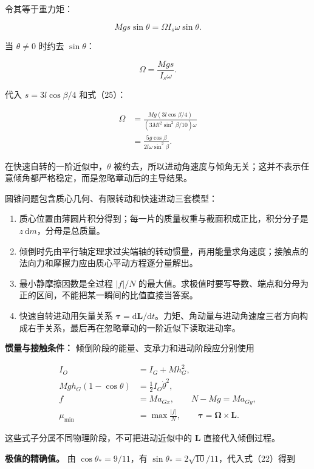 \documentclass[12pt,a4paper,UTF8]{ctexart}
\newcommand{\tightlist}{\setlength{\itemsep}{0pt}\setlength{\parskip}{0pt}}
\begin{document}
令其等于重力矩：

\[Mgs\sin\theta=\Omega I_s\omega\sin\theta.\]

当 \(\theta\ne0\) 时约去 \(\sin\theta\)：

\[\Omega=\frac{Mgs}{I_s\omega}.\]

代入 \(s=3l\cos\beta/4\) 和式（25）：

\[\begin{aligned}
\Omega
&=\frac{Mg(3l\cos\beta/4)}{(3Ml^2\sin^2\beta/10)\omega}\\
&=\boxed{\frac{5g\cos\beta}{2l\omega\sin^2\beta}}.
\end{aligned} \tag{26}\]

在快速自转的一阶近似中，\(\theta\)
被约去，所以进动角速度与倾角无关；这并不表示任意倾角都严格稳定，而是忽略章动后的主导结果。

圆锥问题包含质心几何、有限转动和快速进动三套模型：

\begin{enumerate}
\def\labelenumi{\arabic{enumi}.}
\tightlist
\item
  质心位置由薄圆片积分得到；每一片的质量权重与截面积成正比，积分分子是
  \(z\,\mathrm dm\)，分母是总质量。
\item
  倾倒时先由平行轴定理求过尖端轴的转动惯量，再用能量求角速度；接触点的法向力和摩擦力应由质心平动方程逐分量解出。
\item
  最小静摩擦因数是全过程 \(|f|/N\)
  的最大值。求极值时要写导数、端点和分母为正的区间，不能把某一瞬间的比值直接当答案。
\item
  快速自转进动用矢量关系
  \(\boldsymbol\tau=\mathrm d\boldsymbol L/\mathrm dt\)。力矩、角动量与进动角速度三者方向构成右手关系，最后再在忽略章动的一阶近似下读取进动率。
\end{enumerate}

\textbf{惯量与接触条件：} 倾倒阶段的能量、支承力和进动阶段应分别使用

\[\begin{aligned}
I_O&=I_G+Mh_G^2,\\
Mg h_G(1-\cos\theta)&=\frac12I_O\dot\theta^2,\\
f&=Ma_{Gx},\qquad N-Mg=Ma_{Gy},\\
\mu_{\min}&=\max\frac{|f|}{N},\qquad
\boldsymbol\tau=\boldsymbol\Omega\times\boldsymbol L.
\end{aligned}\]

这些式子分属不同物理阶段，不可把进动近似中的 \(\boldsymbol L\)
直接代入倾倒过程。

\textbf{极值的精确值。} 由 \(\cos\theta_*=9/11\)，有
\(\sin\theta_*=2\sqrt{10}/11\)，代入式（22）得到
\end{document}
